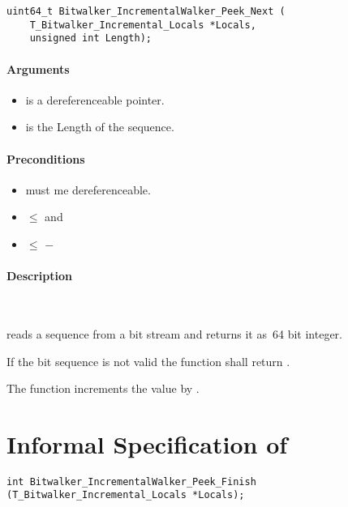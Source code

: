 \begin{lstlisting}[style=acsl-block]
uint64_t Bitwalker_IncrementalWalker_Peek_Next (
    T_Bitwalker_Incremental_Locals *Locals,
    unsigned int Length);
\end{lstlisting}


\paragraph{Arguments}
\begin{itemize}
   \item  {} is a dereferenceable pointer.
   \item {} is the Length of the sequence.
\end{itemize}

\paragraph{Preconditions}
\begin{itemize}
    \item  {} must me dereferenceable.
    \item {} $\leq$  and
    \item {} $\leq$  $-$ 
\end{itemize}

\paragraph{Description}~

\peeknext reads a sequence from a bit stream and returns it as~64 bit integer.


If the bit sequence is not valid the function shall return .

The function increments the value  by .


\clearpage

\section{Informal Specification of }

\begin{lstlisting}[style=acsl-block]
int Bitwalker_IncrementalWalker_Peek_Finish (T_Bitwalker_Incremental_Locals *Locals);
\end{lstlisting}

